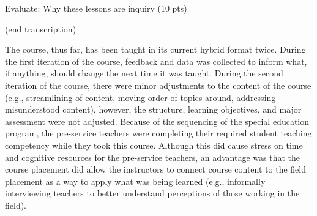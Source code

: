 \documentclass[11.5pt]{sig-alternate} %
\begin{document}
\begin{large}
Evaluate: Why these lessons are inquiry (10 pts)

(end transcription)

The course, thus far, has been taught in its current hybrid format twice.  During the first iteration of the course, feedback and data was collected to inform what, if anything, should change the next time it was taught. During the second iteration of the course, there were minor adjustments to the content of the course (e.g., streamlining of content, moving order of topics around, addressing misunderstood content), however, the structure, learning objectives, and major assessment were not adjusted. Because of the sequencing of the special education program, the pre-service teachers were completing their required student teaching competency while they took this course. Although this did cause stress on time and cognitive resources for the pre-service teachers, an advantage was that the course placement did allow the instructors to connect course content to the field placement as a way to apply what was being learned (e.g., informally interviewing teachers to better understand perceptions of those working in the field). 


\end{large}
\end{document}
